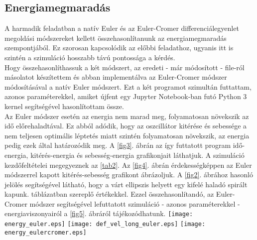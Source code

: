 \begin{multicols}{2}
\subsection{Energiamegmaradás}
A harmadik feladatban a natív Euler és az Euler-Cromer differenciálegyenlet megoldási módszereket kellett összehasonlítanunk az energiamegmaradás szempontjából. Ez szorosan kapcsolódik az előbbi feladathoz, ugyanis itt is szintén a szimuláció hosszabb távú pontossága a kérdés. \\
Hogy összehasonlíthassuk a két módszert, az eredeti - már módosított - file-ról másolatot készítettem és abban implementálva az Euler-Cromer módszer módosításával a natív Euler módszert. Ezt a két programot szimultán futtattam, azonos paraméterekkel, amiket újfent egy Jupyter Notebook-ban futó Python 3 kernel segítségével hasonlítottam össze. \\
Az Euler módszer esetén az energia nem marad meg, folyamatosan növekszik az idő előrehaladtával. Ez abból adódik, hogy az oszcillátor kitérése és sebessége a nem teljesen optimális léptetés miatt szintén folyamatosan növekszik, az energia pedig ezek által határozódik meg. A \ref{fig3}. ábrán az így futtatott program idő-energia, kitérés-energia és sebesség-energia grafikonjait láthatjuk. A szimuláció kezdőfeltételei megegyeznek az \ref{tab2}. Az \ref{fig4}. ábrán érdekességképpen az Euler módszerrel kapott kitérés-sebesség grafikont ábrázoljuk. A \ref{fig2}. ábrához hasonló jelölés segítségével látható, hogy a várt ellipszis helyett egy kifelé haladó spirált kapunk. táblázatban szereplő értékekkel. Ezzel összehasonlítandó, az Euler-Cromer módszer segítségével lefuttatott szimuláció - azonos paraméterekkel - energiaviszonyairól a \ref{fig5}. ábráról tájékozódhatunk.
\hfill \break \hfill \break
{\centering\texttt{[image: energy\_euler.eps]}}
\label{fig3}
\hfill \break \hfill \break
{\centering\texttt{[image: def\_vel\_long\_euler.eps]}}
\label{fig4}
\hfill \break \hfill \break
{\centering\texttt{[image: energy\_eulercromer.eps]}}
\label{fig5}


\end{multicols}
